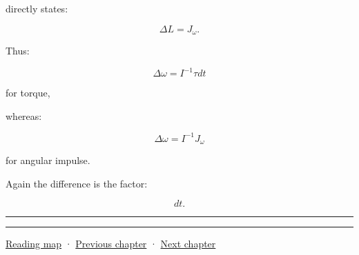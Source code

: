 directly states:

\[
\Delta L
=
J_\omega.
\]

Thus:

\[
\Delta\omega
=
I^{-1}\tau dt
\]

for torque,

whereas:

\[
\Delta\omega
=
I^{-1}J_\omega
\]

for angular impulse.

Again the difference is the factor:

\[
dt.
\]

\begin{center}\rule{0.5\linewidth}{0.5pt}\end{center}

\begin{center}\rule{0.5\linewidth}{0.5pt}\end{center}

\hyperref[volume-reading-map]{Reading map} · \hyperref[06-engine-ii-ch035-a-complete-rigid-body-state-before-the-formula-audit]{Previous chapter} · \hyperref[06-engine-ii-ch037-physical-examples-and-state-validation]{Next chapter}
